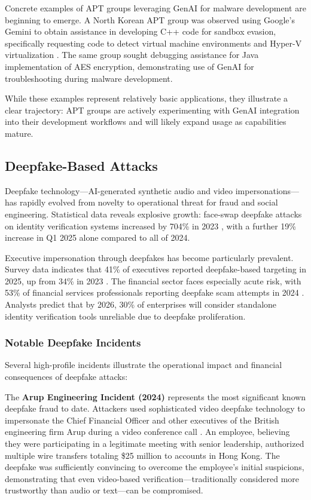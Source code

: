 Concrete examples of APT groups leveraging GenAI for malware development are beginning to emerge. A North Korean APT group was observed using Google's Gemini to obtain assistance in developing C++ code for sandbox evasion, specifically requesting code to detect virtual machine environments and Hyper-V virtualization \cite{google2025}. The same group sought debugging assistance for Java implementation of AES encryption, demonstrating use of GenAI for troubleshooting during malware development.

While these examples represent relatively basic applications, they illustrate a clear trajectory: APT groups are actively experimenting with GenAI integration into their development workflows and will likely expand usage as capabilities mature.

\subsection{Deepfake-Based Attacks}

Deepfake technology—AI-generated synthetic audio and video impersonations—has rapidly evolved from novelty to operational threat for fraud and social engineering. Statistical data reveals explosive growth: face-swap deepfake attacks on identity verification systems increased by 704\% in 2023 \cite{zerothreat2025}, with a further 19\% increase in Q1 2025 alone compared to all of 2024.

Executive impersonation through deepfakes has become particularly prevalent. Survey data indicates that 41\% of executives reported deepfake-based targeting in 2025, up from 34\% in 2023 \cite{blackcloak2025}. The financial sector faces especially acute risk, with 53\% of financial services professionals reporting deepfake scam attempts in 2024 \cite{zerothreat2025}. Analysts predict that by 2026, 30\% of enterprises will consider standalone identity verification tools unreliable due to deepfake proliferation.

\subsubsection{Notable Deepfake Incidents}

Several high-profile incidents illustrate the operational impact and financial consequences of deepfake attacks:

The \textbf{Arup Engineering Incident (2024)} represents the most significant known deepfake fraud to date. Attackers used sophisticated video deepfake technology to impersonate the Chief Financial Officer and other executives of the British engineering firm Arup during a video conference call \cite{zerothreat2025}. An employee, believing they were participating in a legitimate meeting with senior leadership, authorized multiple wire transfers totaling \$25 million to accounts in Hong Kong. The deepfake was sufficiently convincing to overcome the employee's initial suspicions, demonstrating that even video-based verification—traditionally considered more trustworthy than audio or text—can be compromised.

